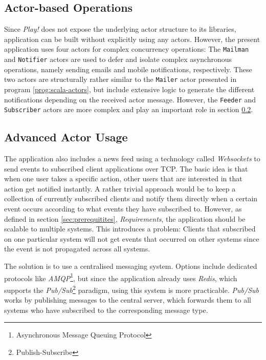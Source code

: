 \subsection{Actor-based Operations}
\label{lab:explicit-actors}
Since \textit{Play!} does not expose the underlying actor structure to its libraries, application can be built without explicitly using any actors. However, the present application uses four actors for complex concurrency operations: The \texttt{Mailman} and \texttt{Notifier} actors are used to defer and isolate complex asynchronous operations, namely sending emails and mobile notifications, respectively. These two actors are structurally rather similar to the \texttt{Mailer} actor presented in program \ref{prog:scala-actors}, but include extensive logic to generate the different notifications depending on the received actor message. However, the \texttt{Feeder} and \texttt{Subscriber} actors are more complex and play an important role in section \ref{lab:news}.

\subsection{Advanced Actor Usage}
\label{lab:news}
The application also includes a news feed using a technology called \textit{Websockets} to send events to subscribed client applications over TCP. The basic idea is that when one user takes a specific action, other users that are interested in that action get notified instantly. A rather trivial approach would be to keep a collection of currently subscribed clients and notify them directly when a certain event occurs according to what events they have subscribed to. However, as defined in section \ref{sec:prerequitites}, \textit{Requirements}, the application should be scalable to multiple systems. This introduces a problem: Clients that subscribed on one particular system will not get events that occurred on other systems since the event is not propagated across all systems.

The solution is to use a centralised messaging system. Options include dedicated protocols like \textit{AMQP}\footnote{Asynchronous Message Queuing Protocol}, but since the application already uses \textit{Redis}, which supports the \textit{Pub/Sub}\footnote{Publish-Subscribe} paradigm, using this system is more practicable. \textit{Pub/Sub} works by publishing messages to the central server, which forwards them to all systems who have subscribed to the corresponding message type.

